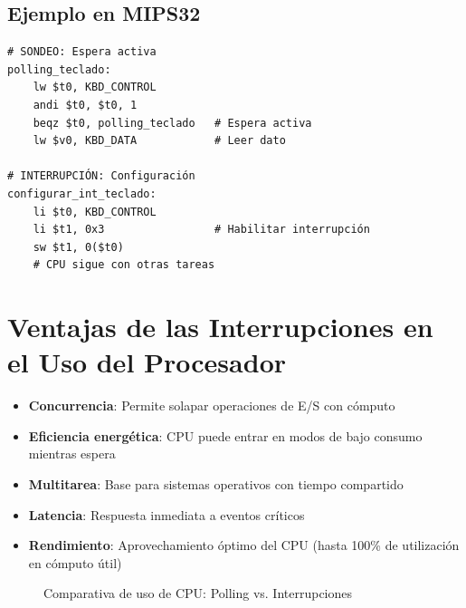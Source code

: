\documentclass[12pt,a4paper]{article}
\begin{document}
\subsection{Ejemplo en MIPS32}
\begin{lstlisting}[style=mipsstyle, caption={Sondeo vs. Interrupción}]
# SONDEO: Espera activa
polling_teclado:
    lw $t0, KBD_CONTROL
    andi $t0, $t0, 1
    beqz $t0, polling_teclado   # Espera activa
    lw $v0, KBD_DATA            # Leer dato
    
# INTERRUPCIÓN: Configuración
configurar_int_teclado:
    li $t0, KBD_CONTROL
    li $t1, 0x3                 # Habilitar interrupción
    sw $t1, 0($t0)
    # CPU sigue con otras tareas
\end{lstlisting}

\section{Ventajas de las Interrupciones en el Uso del Procesador}

\begin{itemize}
    \item \textbf{Concurrencia}: Permite solapar operaciones de E/S con cómputo
    \item \textbf{Eficiencia energética}: CPU puede entrar en modos de bajo consumo mientras espera
    \item \textbf{Multitarea}: Base para sistemas operativos con tiempo compartido
    \item \textbf{Latencia}: Respuesta inmediata a eventos críticos
    \item \textbf{Rendimiento}: Aprovechamiento óptimo del CPU (hasta 100\% de utilización en cómputo útil)
\end{itemize}

\begin{figure}[H]
\centering
{}
\caption{Comparativa de uso de CPU: Polling vs. Interrupciones}
\end{figure}
\end{document}
